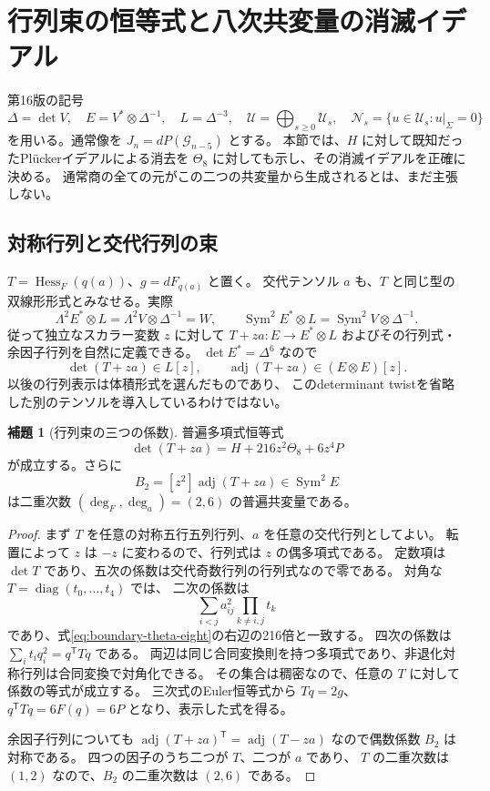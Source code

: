 \documentclass[a4paper,11pt]{ltjsarticle}
\theoremstyle{definition}
\newtheorem{lemma}[theorem]{補題}
\begin{document}
\section{行列束の恒等式と八次共変量の消滅イデアル}
\label{sec:v17-theta-annihilator}

第16版の記号
\[
 \Delta=\det V,\quad E=V^*\otimes\Delta^{-1},\quad
 L=\Delta^{-3},\quad
 \mathcal U=\bigoplus_{s\ge0}\mathcal U_s,\quad
 \mathcal N_s=\{u\in\mathcal U_s:u|_{\Sigma}=0\}
\]
を用いる。通常像を $J_n=dP(\mathcal G_{n-5})$ とする。
本節では、$H$ に対して既知だったPl\"uckerイデアルによる消去を
$\Theta_8$ に対しても示し、その消滅イデアルを正確に決める。
通常商の全ての元がこの二つの共変量から生成されるとは、まだ主張しない。

\subsection{対称行列と交代行列の束}

$T=\operatorname{Hess}_F(q(a))$、$g=dF_{q(a)}$ と置く。
交代テンソル $a$ も、$T$ と同じ型の双線形形式とみなせる。実際
\[
 \Lambda^2E^*\otimes L=\Lambda^2V\otimes\Delta^{-1}=W,
 \qquad
 \operatorname{Sym}^2E^*\otimes L=\operatorname{Sym}^2V\otimes\Delta^{-1}.
\]
従って独立なスカラー変数 $z$ に対して $T+za:E\to E^*\otimes L$
およびその行列式・余因子行列を自然に定義できる。
$\det E^*=\Delta^6$ なので
\[
 \det(T+za)\in L[z],\qquad
 \operatorname{adj}(T+za)\in(E\otimes E)[z].
\]
以後の行列表示は体積形式を選んだものであり、
このdeterminant twistを省略した別のテンソルを導入しているわけではない。

\begin{lemma}[行列束の三つの係数]
\label{lem:v17-matrix-pencil-coefficients}
普遍多項式恒等式
\begin{equation}\label{eq:v17-determinant-pencil}
 \det(T+za)=H+216z^2\Theta_8+6z^4P
\end{equation}
が成立する。さらに
\[
 B_2=[z^2]\operatorname{adj}(T+za)
 \in\operatorname{Sym}^2E
\]
は二重次数 $(\deg_F,\deg_a)=(2,6)$ の普遍共変量である。
\end{lemma}

\begin{proof}
まず $T$ を任意の対称五行五列行列、$a$ を任意の交代行列としてよい。
転置によって $z$ は $-z$ に変わるので、行列式は $z$ の偶多項式である。
定数項は $\det T$ であり、五次の係数は交代奇数行列の行列式なので零である。
対角な $T=\operatorname{diag}(t_0,\ldots,t_4)$ では、
二次の係数は
\[
 \sum_{i<j}a_{ij}^2\prod_{k\ne i,j}t_k
\]
であり、式\eqref{eq:boundary-theta-eight}の右辺の216倍と一致する。
四次の係数は $\sum_i t_iq_i^2=q^{\mathsf T}Tq$ である。
両辺は同じ合同変換則を持つ多項式であり、非退化対称行列は合同変換で対角化できる。
その集合は稠密なので、任意の $T$ に対して係数の等式が成立する。
三次式のEuler恒等式から $Tq=2g$、
$q^{\mathsf T}Tq=6F(q)=6P$ となり、表示した式を得る。

余因子行列についても
$\operatorname{adj}(T+za)^{\mathsf T}=\operatorname{adj}(T-za)$
なので偶数係数 $B_2$ は対称である。
四つの因子のうち二つが $T$、二つが $a$ であり、
$T$ の二重次数は $(1,2)$ なので、$B_2$ の二重次数は $(2,6)$ である。
\end{proof}
\end{document}
